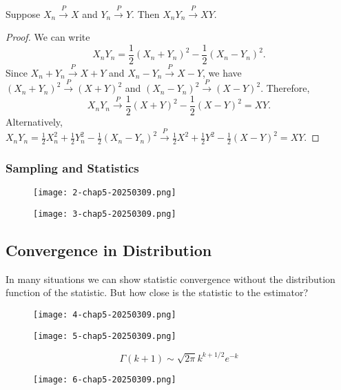 \begin{theorem}
Suppose $X_n \overset{P}{\to} X$ and $Y_n \overset{P}{\to} Y$. Then $X_n Y_n \overset{P}{\to} XY$.
\end{theorem}
\begin{proof}
We can write
\[
X_n Y_n = \frac{1}{2}(X_n + Y_n)^2 - \frac{1}{2}(X_n - Y_n)^2.
\]
Since $X_n + Y_n \overset{P}{\to} X + Y$ and $X_n - Y_n \overset{P}{\to} X - Y$, we have $(X_n + Y_n)^2 \overset{P}{\to} (X + Y)^2$ and $(X_n - Y_n)^2 \overset{P}{\to} (X - Y)^2$. Therefore,
\[
X_n Y_n \overset{P}{\to} \frac{1}{2}(X + Y)^2 - \frac{1}{2}(X - Y)^2 = XY.
\]
Alternatively, $X_nY_n=\frac{1}{2}X_n^{2}+\frac{1}{2}Y_n^{2}-\frac{1}{2}(X_n-Y_n)^{2}\overset{ P }{ \to }\frac{1}{2}X^{2}+\frac{1}{2}Y^{2}-\frac{1}{2}(X-Y)^{2}=XY$.
\end{proof}

\subsubsection{Sampling and Statistics}

\begin{figure}[H]
\centering
\texttt{[image: 2-chap5-20250309.png]}
\label{}
\end{figure}

\begin{figure}[H]
\centering
\texttt{[image: 3-chap5-20250309.png]}
\label{}
\end{figure}

\subsection{Convergence in Distribution}

In many situations we can show statistic convergence without the distribution function of the statistic. But how close is the statistic to the estimator?

\begin{figure}[H]
\centering
\texttt{[image: 4-chap5-20250309.png]}
\label{}
\end{figure}

\begin{figure}[H]
\centering
\texttt{[image: 5-chap5-20250309.png]}
\label{}
\end{figure}

\begin{theorem}
\[
\Gamma(k+1)\sim \sqrt{ 2\pi }k^{k+1/2 }e^{ -k }
\]
\end{theorem}
\begin{figure}[H]
\centering
\texttt{[image: 6-chap5-20250309.png]}
\label{}
\end{figure}

